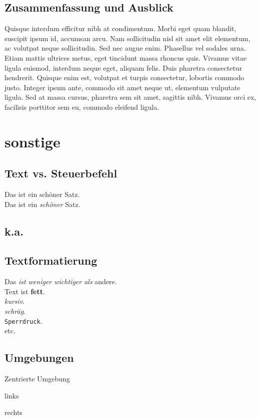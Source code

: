 \documentclass[a4paper, ngerman, oneside, 10pt]{article}
\begin{document}
\subsection{Zusammenfassung und Ausblick}
Quisque interdum efficitur nibh at condimentum. Morbi eget quam blandit, suscipit ipsum id, accumsan arcu. Nam sollicitudin nisl sit amet elit elementum, ac volutpat neque sollicitudin. Sed nec augue enim. Phasellus vel sodales urna. Etiam mattis ultrices metus, eget tincidunt massa rhoncus quis. Vivamus vitae ligula euismod, interdum neque eget, aliquam felis. Duis pharetra consectetur hendrerit. Quisque enim est, volutpat et turpis consectetur, lobortis commodo justo. Integer ipsum ante, commodo sit amet neque ut, elementum vulputate ligula. Sed at massa cursus, pharetra sem sit amet, sagittis nibh. Vivamus orci ex, facilisis porttitor sem eu, commodo eleifend ligula.

\section{sonstige}
\subsection{Text vs. Steuerbefehl}
Das ist ein schöner Satz.\\ Das ist ein \emph{schöner} Satz.
\subsection{k.a.}

\subsection{Textformatierung}
Das \emph{ist \emph{weniger wichtiger} als} andere.\\
Text ist \textbf{fett}.\\
\textit{kursiv}.\\
\textsl{schräg}.\\
\texttt{Sperrdruck}.\\
etc.

\subsection{Umgebungen}
\begin{center}
	Zentrierte Umgebung
\end{center}
\begin{flushleft}
	links
\end{flushleft}
\begin{flushright}
	rechts
\end{flushright}
\end{document}
